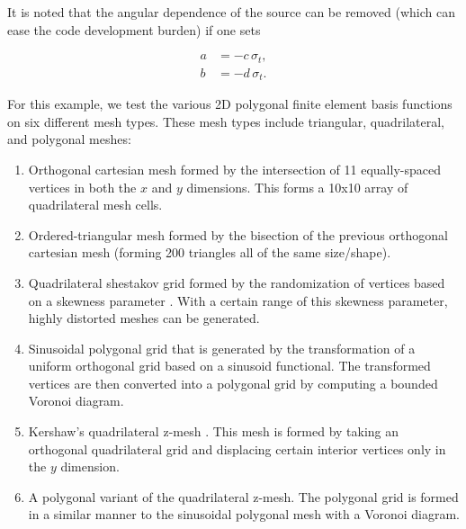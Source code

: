 \noindent It is noted that the angular dependence of the source can be removed (which can ease the code development burden) if one sets

\begin{equation}
\label{eq::BF_Results_Linear_removeterms}
\begin{aligned}
	a &= - c \, \sigma_t, \\
	b &= - d \, \sigma_t.
\end{aligned}
\end{equation}

For this example, we test the various 2D polygonal finite element basis functions on six different mesh types. These mesh types include triangular, quadrilateral, and polygonal meshes:

\begin{enumerate}
	\item Orthogonal cartesian mesh formed by the intersection of 11 equally-spaced vertices in both the $x$ and $y$ dimensions. This forms a 10x10 array of quadrilateral mesh cells.
	\item Ordered-triangular mesh formed by the bisection of the previous orthogonal cartesian mesh (forming 200 triangles all of the same size/shape).
	\item Quadrilateral shestakov grid formed by the randomization of vertices based on a skewness parameter \cite{shestakov1988solution,shestakov1990test}. With a certain range of this skewness parameter, highly distorted meshes can be generated.
	\item Sinusoidal polygonal grid that is generated by the transformation of a uniform orthogonal grid based on a sinusoid functional. The transformed vertices are then converted into a polygonal grid by computing a bounded Voronoi diagram.
	\item Kershaw's quadrilateral z-mesh \cite{kershaw1981differencing}. This mesh is formed by taking an orthogonal quadrilateral grid and displacing certain interior vertices only in the $y$ dimension.
	\item A polygonal variant of the quadrilateral z-mesh. The polygonal grid is formed in a similar manner to the sinusoidal polygonal mesh with a Voronoi diagram.
\end{enumerate}

